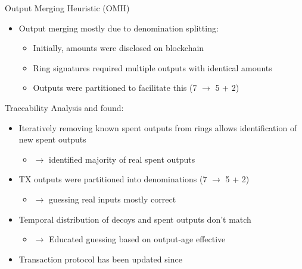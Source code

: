 \begin{frame}{Output Merging Heuristic (OMH)}
	\begin{itemize}
		\item Output merging mostly due to denomination splitting:
		\begin{itemize}
			\item Initially, amounts were disclosed on blockchain
			\item Ring signatures required multiple outputs with identical amounts
			\item Outputs were partitioned to facilitate this (7 $\to$ 5 + 2)
		\end{itemize}
	\end{itemize}
\end{frame}

\begin{frame}{Traceability Analysis}
	\cite{kumar_traceability_2017} and \cite{moser_empirical_2018} found:
	\begin{itemize}[<+->]
		\item Iteratively removing known spent outputs from rings allows identification of new spent outputs


		\begin{itemize}
			\item $\to$ identified majority of real spent outputs
		\end{itemize}
		\item TX outputs were partitioned into denominations (7 $\to$ 5 + 2)
		\begin{itemize}
			\item $\to$ guessing real inputs mostly correct
		\end{itemize}
		\item Temporal distribution of decoys and spent outputs don't match
		\begin{itemize}
			\item $\to$ Educated guessing based on output-age effective 
		\end{itemize}
		\item Transaction protocol has been updated since 
	\end{itemize}
\end{frame}




